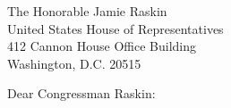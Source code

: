 

\begin{letter}{

The Honorable Jamie Raskin\\
United States House of Representatives\\
412 Cannon House Office Building\\
Washington, D.C. 20515

}
\opening{Dear Congressman Raskin:}

\blockA{}

\blockB{}


\end{letter}

